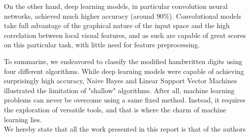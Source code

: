 \documentclass{acm_proc_article-sp}
\begin{document}
On the other hand, deep learning models, in particular convolution neural networks, achieved much higher accuracy (around $90 \%$). Convolutional models take full advantage of the graphical nature of the input space and the high correlation between local visual features, and as such are capable of great scores on this particular task, with little need for feature preprocessing.

To summarize, we endeavored to classify the modified handwritten digits using four different algorithms. While deep learning models were capable of  achieving surprisingly high accuracy,  Naive Bayes and Linear Support Vector Machines illustrated the limitation of "shallow" algorithms. After all, machine learning problems can never be overcome using a same fixed method. Instead, it requires the exploration of versatile tools, and that is where the charm of machine learning lies.\\



We	hereby	state	that	all	the	work	 presented	in	this	report	is	that	of	the	authors

  
\end{document}
